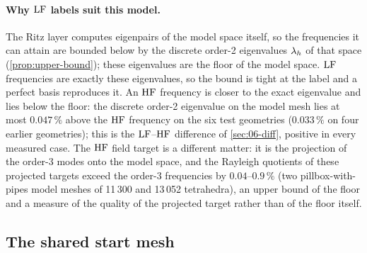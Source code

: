 \paragraph{Why $\mathrm{LF}$ labels suit this model.} The Ritz layer computes eigenpairs of the model space itself, so the
frequencies it can attain are bounded below by the discrete order-2 eigenvalues $\lamh$ of that space
(\cref{prop:upper-bound}); these eigenvalues are the floor of the model space. $\mathrm{LF}$ frequencies are exactly these
eigenvalues, so the bound is tight at the label and a perfect basis reproduces it. An $\mathrm{HF}$ frequency is closer to
the exact eigenvalue and lies below the floor: the discrete order-2 eigenvalue on the model mesh lies at most
$0.047\,\%$ above the $\mathrm{HF}$ frequency on the six test geometries ($0.033\,\%$ on four earlier geometries); this is
the $\mathrm{LF}$--$\mathrm{HF}$ difference of \cref{sec:06-diff}, positive in every measured case.
The $\mathrm{HF}$ field target is a different matter: it is the projection of the order-3 modes onto the model space,
and the Rayleigh quotients of these projected targets exceed the order-3 frequencies by $0.04$--$0.9\,\%$ (two
pillbox-with-pipes model meshes of 11\,300 and 13\,052 tetrahedra), an upper bound of the floor and a measure of the
quality of the projected target rather than of the floor itself.

\subsection{The shared start mesh}\label{sec:06-mesh}

